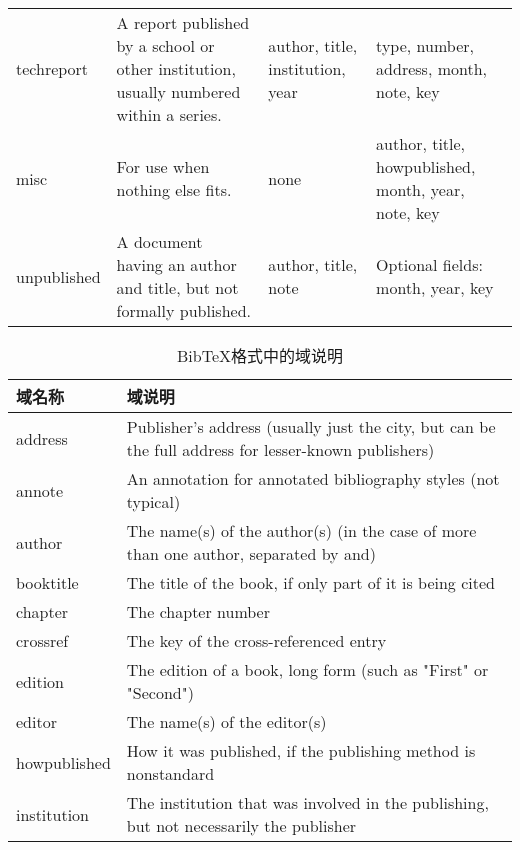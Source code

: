 \documentclass[twoside]{article} %
\begin{document}
\begin{table}[!htb]
\begin{tabular}{p{2cm}p{3cm}p{3cm}p{6cm}}
techreport &
A report published by a school or other institution, usually numbered within a series. &
author, title, institution, year &
type, number, address, month, note, key \\

misc &
For use when nothing else fits. &
none &
author, title, howpublished, month, year, note, key \\

unpublished &
A document having an author and title, but not formally published. &
author, title, note &
Optional fields: month, year, key\\ \hline
    \end{tabular}
\end{table}%

\begin{table}[!htb]
\centering
\caption{BibTeX格式中的域说明}\label{tab:bibtex:field}
\footnotesize
\begin{tabular}{p{3cm}p{12cm}}
   \hline
域名称 & 域说明 \\ \hline
address &
Publisher's address (usually just the city, but can be the full address for lesser-known publishers) \\

annote &
An annotation for annotated bibliography styles (not typical)\\

author &
The name(s) of the author(s) (in the case of more than one author, separated by and) \\

booktitle &
The title of the book, if only part of it is being cited \\

chapter &
The chapter number \\

crossref &
The key of the cross-referenced entry \\

edition &
The edition of a book, long form (such as "First" or "Second") \\

editor &
The name(s) of the editor(s) \\

howpublished &
How it was published, if the publishing method is nonstandard \\

institution &
The institution that was involved in the publishing, but not necessarily the publisher \\


\end{tabular}
\end{table}
\end{document}
